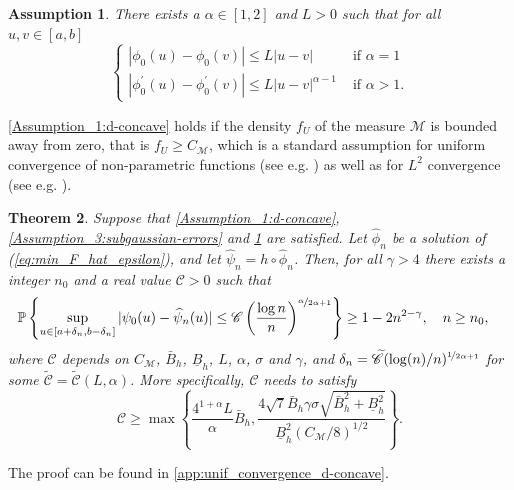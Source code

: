 \documentclass{article} %
\def\eqref#1{equation~\ref{#1}}
\renewcommand{\eqref}[1]{(\ref{#1})}
\newtheorem{theorem}{Theorem}[section]
\newtheorem{assumption}[theorem]{Assumption}
\begin{document}
\begin{assumption}\label{Assumption_2:d-concave}
There exists a $\alpha \in [1,2]$ and $L>0$ such that for all $u,v \in [a,b]$
\begin{equation}
\left\{\begin{array}{cl}
|\phi_0(u)-\phi_0(v)| \leq L|u-v| & \text { if } \alpha=1 \\
\left|\phi_0^{\prime}(u)-\phi_0^{\prime}(v)\right| \leq L|u-v|^{\alpha-1} & \text { if } \alpha>1 .
\end{array}\right.
\end{equation}
\end{assumption}
\noindent
\cref{Assumption_1:d-concave} holds if the density $f_U$ of the measure $\mathscr{M}$ is bounded away from zero, that is $f_U\geq C_{\mathscr{M}}$, which is a standard assumption for uniform convergence of non-parametric functions (see e.g. \cite{dumbgen2004consistency, mosching2020monotone}) as well as for $L^2$ convergence (see e.g. \cite{groeneboom2018current, balabdaoui2019least}).

\begin{theorem}\label{thm:unif_convergence_d-concave}
Suppose that \cref{Assumption_1:d-concave}, \cref{Assumption_3:subgaussian-errors} and \cref{Assumption_2:d-concave} are satisfied. Let $\widehat{\phi}_n$ be a solution of \eqref{eq:min_F_hat_epsilon}, and let $\widehat{\psi}_n = h \circ \widehat{\phi}_n$. Then, for all $\gamma>4$ there exists a integer $n_0$ and a real value $\mathscr{C} >0$ such that
$$
\begin{aligned}
\mathbb{P}\left\{\sup _{u \in[a+\delta_n, b-\delta_n]} |\psi_0(u) - \widehat{\psi}_n(u)| \leq \mathscr{C} \left( \frac{\log n}{n}\right)^{\nicefrac{\alpha}{2\alpha +1}}  \right\} & \geq 1-2n^{2-\gamma}, \quad n \geq n_0 ,
\end{aligned}
$$
where $\mathscr{C}$ depends on $C_{\mathscr{M}}$, $\bar{B}_{h}$, $\underline{B}_{h}$, $L$, $\alpha$, $\sigma$ and $\gamma$, and $\delta_n = \widetilde{\mathscr{C}} (\log (n) / n)^{\nicefrac{1}{2\alpha +1}}$ for some $\widetilde{\mathscr{C}} = \widetilde{\mathscr{C}}(L,\alpha)$. More specifically, $\mathscr{C}$ needs to satisfy
$$
\mathscr{C} \geq \max\left\{\frac{4^{1+\alpha}L}{\alpha}\bar{B}_{h}, \frac{4\sqrt{7}\bar{B}_{h}\gamma \sigma  \sqrt{\bar{B}_{h}^2+\underline{B}_{h}^2}}{\underline{B}_{h}^{2}  \left(C_{\mathscr{M}} / 8\right)^{1 / 2}}\right\}.
$$
\end{theorem}

The proof can be found in \cref{app:unif_convergence_d-concave}.
\end{document}
